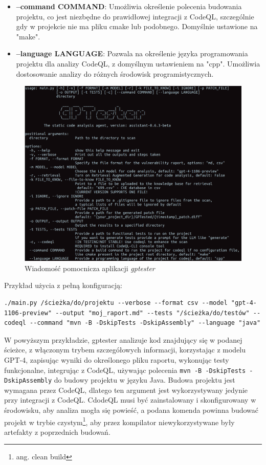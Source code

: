 \begin{itemize}
    \item \textbf{--command COMMAND}: Umożliwia określenie polecenia budowania projektu, co jest niezbędne do prawidłowej integracji z CodeQL, szczególnie gdy w projekcie nie ma pliku cmake lub podobnego. Domyślnie ustawione na "make".
    \item \textbf{--language LANGUAGE}: Pozwala na określenie języka programowania projektu dla analizy CodeQL, z domyślnym ustawieniem na "cpp". Umożliwia dostosowanie analizy do różnych środowisk programistycznych.
\end{itemize}
\begin{figure}[H]
    \centering
    \includegraphics[width=\linewidth]{img/gptester-help.png}
    \caption{Wiadomość pomocnicza aplikacji \textit{gptester}}
    \label{fig:gptester-help}
\end{figure}

Przykład użycia z pełną konfiguracją:

\begin{listing}
    \begin{verbatim}
./main.py /ścieżka/do/projektu --verbose --format csv --model "gpt-4-1106-preview" --output "moj_raport.md" --tests "/ścieżka/do/testów" --codeql --command "mvn -B -DskipTests -DskipAssembly" --language "java"
\end{verbatim}
\end{listing}

W powyższym przykładzie, gptester analizuje kod znajdujący się w podanej ścieżce, z włączonym trybem szczegółowych informacji, korzystając z modelu GPT-4, zapisując wyniki do określonego pliku raportu, wykonując testy funkcjonalne, integrując z CodeQL, używając polecenia \texttt{mvn -B -DskipTests -DskipAssembly} do budowy projektu w języku Java. Budowa projektu jest wymagana przez CodeQL, dlatego ten argument jest wykorzystywany jedynie przy integracji z CodeQL. CdodeQL musi być zainstalowany i skonfigurowany w środowisku, aby analiza mogła się powieść, a podana komenda powinna budować projekt w trybie czystym\footnote{ang. clean build}, aby przez kompilator niewykorzystywane były artefakty z poprzednich budowań.


